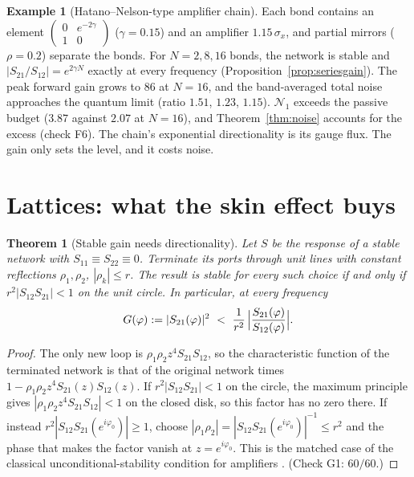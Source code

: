 \documentclass[11pt]{article}
\newtheorem{theorem}{Theorem}
\theoremstyle{definition}
\newtheorem{example}{Example}
\theoremstyle{remark}
\newcommand{\NN}{\mathcal N_1}
\begin{document}
\begin{example}[Hatano--Nelson-type amplifier chain]\label{ex:hnamp}
Each bond contains an element $\left(\begin{smallmatrix}0&e^{-2\gamma}\\1&0\end{smallmatrix}\right)$ ($\gamma=0.15$) and an amplifier $1.15\,\sigma_x$, and partial mirrors ($\rho=0.2$) separate the bonds. For $N=2,8,16$ bonds, the network is stable and $|S_{21}/S_{12}|=e^{2\gamma N}$ exactly at every frequency (Proposition~\ref{prop:seriesgain}). The peak forward gain grows to $86$ at $N=16$, and the band-averaged total noise approaches the quantum limit (ratio $1.51$, $1.23$, $1.15$). $\NN$ exceeds the passive budget ($3.87$ against $2.07$ at $N=16$), and Theorem~\ref{thm:noise} accounts for the excess (check F6). The chain's exponential directionality is its gauge flux. The gain only sets the level, and it costs noise.
\end{example}

\section{Lattices: what the skin effect buys}\label{sec:lat}

\begin{theorem}[Stable gain needs directionality]\label{thm:stab}
Let $S$ be the response of a stable network with $S_{11}\equiv S_{22}\equiv0$. Terminate its ports through unit lines with constant reflections $\rho_1,\rho_2$, $|\rho_k|\le r$. The result is stable for every such choice if and only if $r^2|S_{12}S_{21}|<1$ on the unit circle. In particular, at every frequency
\[
G(\varphi):=|S_{21}(\varphi)|^2\ <\ \frac{1}{r^2}\,\Bigl|\frac{S_{21}(\varphi)}{S_{12}(\varphi)}\Bigr| .
\]
\end{theorem}
\begin{proof}
The only new loop is $\rho_1\rho_2z^4S_{21}S_{12}$, so the characteristic function of the terminated network is that of the original network times $1-\rho_1\rho_2z^4S_{21}(z)S_{12}(z)$. If $r^2|S_{12}S_{21}|<1$ on the circle, the maximum principle gives $|\rho_1\rho_2z^4S_{21}S_{12}|<1$ on the closed disk, so this factor has no zero there. If instead $r^2|S_{12}S_{21}(e^{i\varphi_0})|\ge1$, choose $|\rho_1\rho_2|=|S_{12}S_{21}(e^{i\varphi_0})|^{-1}\le r^2$ and the phase that makes the factor vanish at $z=e^{i\varphi_0}$. This is the matched case of the classical unconditional-stability condition for amplifiers \cite{Rol62}. (Check G1: $60/60$.)
\end{proof}
\end{document}
